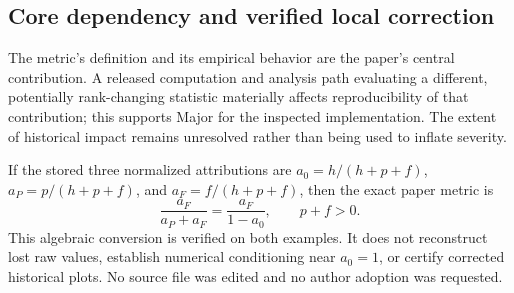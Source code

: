 \documentclass[10pt]{article}
\begin{document}
\subsection*{Core dependency and verified local correction}
The metric’s definition and its empirical behavior are the paper’s central contribution. A released computation and analysis path evaluating a different, potentially rank-changing statistic materially affects reproducibility of that contribution; this supports Major for the inspected implementation. The extent of historical impact remains unresolved rather than being used to inflate severity.\par
If the stored three normalized attributions are \(a_0=h/(h+p+f)\), \(a_P=p/(h+p+f)\), and \(a_F=f/(h+p+f)\), then the exact paper metric is \[\frac{a_F}{a_P+a_F}=\frac{a_F}{1-a_0},\qquad p+f>0.\] This algebraic conversion is verified on both examples. It does not reconstruct lost raw values, establish numerical conditioning near \(a_0=1\), or certify corrected historical plots. No source file was edited and no author adoption was requested.\par
\end{document}
